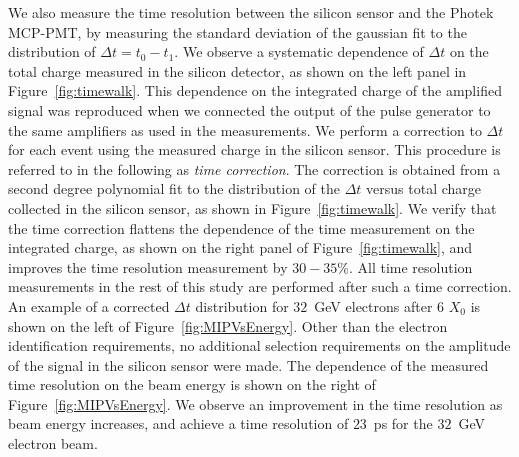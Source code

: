 We also measure the time resolution between the silicon sensor and the Photek
MCP-PMT, by measuring the standard deviation of the gaussian fit to the
distribution of $\Delta t = t_0-t_1$. We observe a systematic dependence of
$\Delta t$ on the total charge measured in the silicon detector, as shown on the
left panel in Figure~\ref{fig:timewalk}. This dependence on the integrated
charge of the amplified signal was reproduced when we connected the output of
the pulse generator to the same amplifiers as used in the measurements. We
perform a correction to $\Delta t$ for each event using the measured charge in
the silicon sensor. This procedure is referred to in the following as
\textit{time correction}. The correction is obtained from a second degree
polynomial fit to the distribution of the $\Delta t$ versus total charge
collected in the silicon sensor, as shown in Figure~\ref{fig:timewalk}. We
verify that the time correction flattens the dependence of the time measurement
on the integrated charge, as shown on the right panel of
Figure~\ref{fig:timewalk}, and improves the time resolution measurement by
$30-35$\%. All time resolution measurements in the rest of this study are
performed after such a time correction. An example of a corrected $\Delta t$
distribution for $32$~GeV electrons after 6 $X_0$ is shown on the left of
Figure~\ref{fig:MIPVsEnergy}. Other than the electron
identification requirements, no additional selection requirements on the
amplitude of the signal in the silicon sensor were made. The dependence of the
measured time resolution on the beam energy is shown on the right of
Figure~\ref{fig:MIPVsEnergy}. We observe an improvement in the time resolution
as beam energy increases, and achieve a time resolution of $23$~ps for the
$32$~GeV electron beam.

